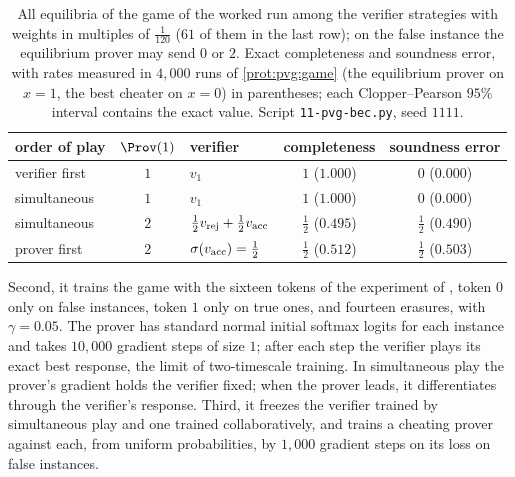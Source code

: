 \begin{refsection}
\begin{table}[t]
\centering\small
\begin{tabular}{@{}l c l c c@{}}
\toprule
order of play & $\Prov(1)$ & verifier & completeness & soundness error\\
\midrule
verifier first & $1$ & $v_1$ & $1$ \enspace($1.000$) & $0$ \enspace($0.000$)\\
simultaneous & $1$ & $v_1$ & $1$ \enspace($1.000$) & $0$ \enspace($0.000$)\\
simultaneous & $2$ & $\frac12v_{\mathrm{rej}}+\frac12v_{\mathrm{acc}}$ & $\frac12$ \enspace($0.495$) & $\frac12$ \enspace($0.490$)\\
prover first & $2$ & $\sigma(v_{\mathrm{acc}})=\frac12$ & $\frac12$ \enspace($0.512$) & $\frac12$ \enspace($0.503$)\\
\bottomrule
\end{tabular}
\caption{All equilibria of the game of the worked run among the verifier strategies with weights in multiples of $\frac1{120}$ ($61$ of them in the last row); on the false instance the equilibrium prover may send $0$ or $2$. Exact completeness and soundness error, with rates measured in $4{,}000$ runs of \cref{prot:pvg:game} (the equilibrium prover on $x=1$, the best cheater on $x=0$) in parentheses; each Clopper--Pearson $95\%$ interval contains the exact value. Script \texttt{11-pvg-bec.py}, seed $1111$.}\label{tab:pvg:equilibria}
\end{table}

Second, it trains the game with the sixteen tokens of the experiment of \textcite{AnilEtAl2021}, token $0$ only on false instances, token $1$ only on true ones, and fourteen erasures, with $\gamma=0.05$. The prover has standard normal initial softmax logits for each instance and takes $10{,}000$ gradient steps of size $1$; after each step the verifier plays its exact best response, the limit of two-timescale training. In simultaneous play the prover's gradient holds the verifier fixed; when the prover leads, it differentiates through the verifier's response. Third, it freezes the verifier trained by simultaneous play and one trained collaboratively, and trains a cheating prover against each, from uniform probabilities, by $1{,}000$ gradient steps on its loss on false instances.


\end{refsection}

